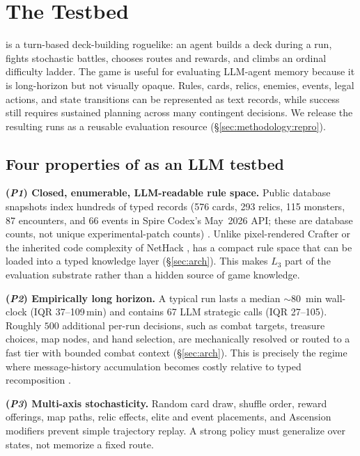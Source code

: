 \section{The \stspad{} Testbed}
\label{sec:testbed}

\stspad{} is a turn-based deck-building roguelike: an agent builds
a deck during a run, fights stochastic battles, chooses routes and
rewards, and climbs an ordinal difficulty ladder. The game is
useful for evaluating LLM-agent memory because it is long-horizon
but not visually opaque. Rules, cards, relics, enemies, events,
legal actions, and state transitions can be represented as text
records, while success still requires sustained planning across
many contingent decisions. We release the resulting runs as a
reusable evaluation resource (\S\ref{sec:methodology:repro}).

\subsection{Four properties of \stspad{} as an LLM testbed}
\label{sec:testbed:props}

\textbf{(\emph{P1}) Closed, enumerable, LLM-readable rule space.}
Public database snapshots index hundreds of typed records (576
cards, 293 relics, 115 monsters, 87 encounters, and 66 events in
Spire Codex's May~2026 API; these are database counts, not unique
experimental-patch counts) \citep{spirecodex-2026}. Unlike
pixel-rendered Crafter \citep{crafter2022} or the inherited code
complexity of NetHack \citep{nethack2020}, \stspad{} has a compact
rule space that can be loaded into a typed knowledge layer
(\S\ref{sec:arch}). This makes $L_3$ part of the evaluation
substrate rather than a hidden source of game knowledge.

\textbf{(\emph{P2}) Empirically long horizon.} A typical run lasts
a median $\sim$80~min wall-clock (IQR 37--109\,min) and contains
67 LLM strategic calls (IQR 27--105). Roughly $500$ additional
per-run decisions, such as combat targets, treasure choices, map
nodes, and hand selection, are mechanically resolved or routed to a
fast tier with bounded combat context (\S\ref{sec:arch}). This is
precisely the regime where message-history accumulation becomes
costly relative to typed recomposition
\citep{sinha-horizon-2026,horizon-mirage-2026,kwa-metr-2025}.

\textbf{(\emph{P3}) Multi-axis stochasticity.} Random card draw,
shuffle order, reward offerings, map paths, relic effects, elite
and event placements, and Ascension modifiers prevent simple
trajectory replay. A strong policy must generalize over states, not
memorize a fixed route.

